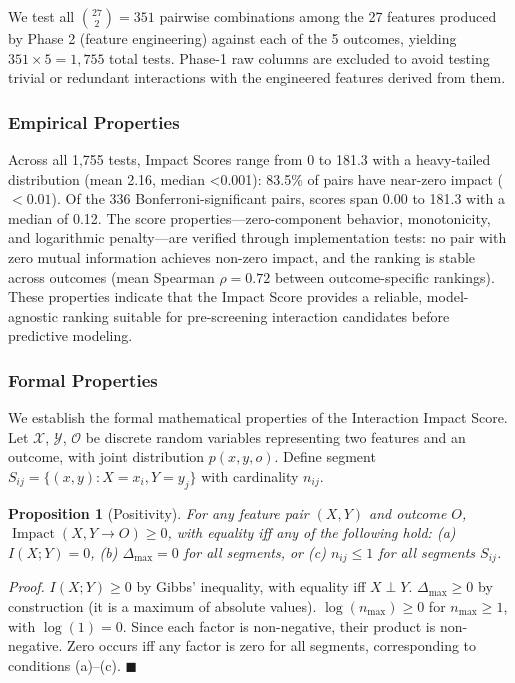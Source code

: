 \documentclass[conference]{IEEEtran}
\newtheorem{proposition}{Proposition}
\begin{document}
We test all $\binom{27}{2} = 351$ pairwise combinations among the 27 features produced by Phase 2 (feature engineering) against each of the 5 outcomes, yielding $351 \times 5 = 1{,}755$ total tests. Phase-1 raw columns are excluded to avoid testing trivial or redundant interactions with the engineered features derived from them.

\subsubsection*{Empirical Properties}
Across all 1,755 tests, Impact Scores range from 0 to 181.3 with a heavy-tailed distribution (mean 2.16, median <0.001): 83.5\% of pairs have near-zero impact ($<0.01$). Of the 336 Bonferroni-significant pairs, scores span 0.00 to 181.3 with a median of 0.12. The score properties---zero-component behavior, monotonicity, and logarithmic penalty---are verified through implementation tests: no pair with zero mutual information achieves non-zero impact, and the ranking is stable across outcomes (mean Spearman $\rho = 0.72$ between outcome-specific rankings). These properties indicate that the Impact Score provides a reliable, model-agnostic ranking suitable for pre-screening interaction candidates before predictive modeling.

\subsubsection{Formal Properties}

We establish the formal mathematical properties of the Interaction Impact Score. Let $\mathcal{X}$, $\mathcal{Y}$, $\mathcal{O}$ be discrete random variables representing two features and an outcome, with joint distribution $p(x,y,o)$. Define segment $S_{ij} = \{(x,y): X=x_i, Y=y_j\}$ with cardinality $n_{ij}$.

\begin{proposition}[Positivity]
\label{prop:positivity}
For any feature pair $(X,Y)$ and outcome $O$, $\operatorname{Impact}(X,Y \to O) \geq 0$, with equality iff any of the following hold: (a) $I(X;Y) = 0$, (b) $\Delta_{\max} = 0$ for all segments, or (c) $n_{ij} \leq 1$ for all segments $S_{ij}$.
\end{proposition}

\textit{Proof.} $I(X;Y) \geq 0$ by Gibbs' inequality, with equality iff $X \perp Y$. $\Delta_{\max} \geq 0$ by construction (it is a maximum of absolute values). $\log(n_{\max}) \geq 0$ for $n_{\max} \geq 1$, with $\log(1)=0$. Since each factor is non-negative, their product is non-negative. Zero occurs iff any factor is zero for all segments, corresponding to conditions (a)--(c). \hfill $\blacksquare$
\end{document}
